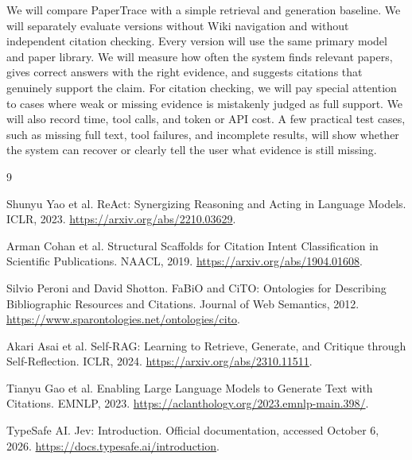 \documentclass{article}
\begin{document}
We will compare PaperTrace with a simple retrieval and generation baseline. We will separately evaluate versions without Wiki navigation and without independent citation checking. Every version will use
the same primary model and paper library. We will measure how often the system finds relevant papers, gives
correct answers with the right evidence, and suggests citations that genuinely support the claim.
For citation checking, we will pay special attention to cases where weak or missing evidence is
mistakenly judged as full support. We will also record time, tool calls, and token or API cost. A
few practical test cases, such as missing full text, tool failures, and incomplete results, will
show whether the system can recover or clearly tell the user what evidence is still missing.

\clearpage
\begin{thebibliography}{9}

Shunyu Yao et al.
\newblock ReAct: Synergizing Reasoning and Acting in Language Models.
\newblock ICLR, 2023. \url{https://arxiv.org/abs/2210.03629}.

Arman Cohan et al.
\newblock Structural Scaffolds for Citation Intent Classification in Scientific Publications.
\newblock NAACL, 2019. \url{https://arxiv.org/abs/1904.01608}.

Silvio Peroni and David Shotton.
\newblock FaBiO and CiTO: Ontologies for Describing Bibliographic Resources and Citations.
\newblock Journal of Web Semantics, 2012. \url{https://www.sparontologies.net/ontologies/cito}.

Akari Asai et al.
\newblock Self-RAG: Learning to Retrieve, Generate, and Critique through Self-Reflection.
\newblock ICLR, 2024. \url{https://arxiv.org/abs/2310.11511}.

Tianyu Gao et al.
\newblock Enabling Large Language Models to Generate Text with Citations.
\newblock EMNLP, 2023. \url{https://aclanthology.org/2023.emnlp-main.398/}.

TypeSafe AI.
\newblock Jev: Introduction. Official documentation, accessed October 6, 2026.
\newblock \url{https://docs.typesafe.ai/introduction}.

\end{thebibliography}
\end{document}
